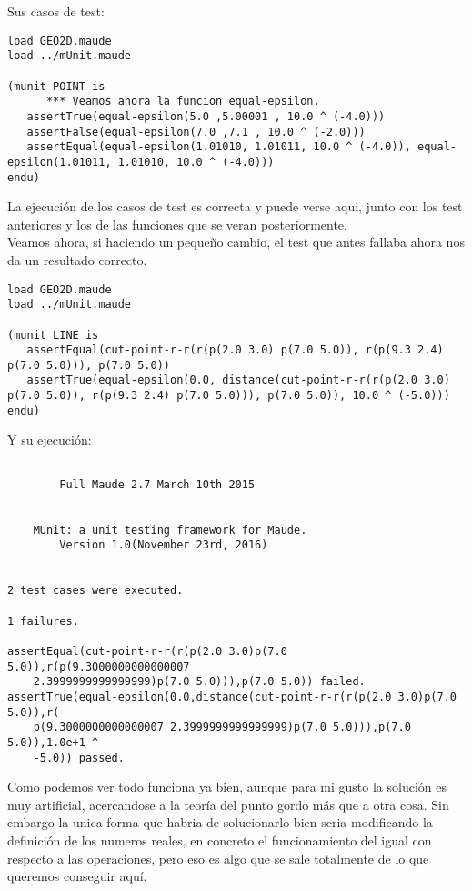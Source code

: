 Sus casos de test:

\begin{verbatim}
load GEO2D.maude
load ../mUnit.maude

(munit POINT is
      *** Veamos ahora la funcion equal-epsilon.
   assertTrue(equal-epsilon(5.0 ,5.00001 , 10.0 ^ (-4.0)))
   assertFalse(equal-epsilon(7.0 ,7.1 , 10.0 ^ (-2.0)))
   assertEqual(equal-epsilon(1.01010, 1.01011, 10.0 ^ (-4.0)), equal-epsilon(1.01011, 1.01010, 10.0 ^ (-4.0)))
endu)

\end{verbatim}

La ejecuci\'on de los casos de test es correcta y puede verse aqui, junto con los test anteriores y los de las funciones que se veran posteriormente. \\

Veamos ahora, si haciendo un pequeño cambio, el test que antes fallaba ahora nos da un resultado correcto.

\begin{verbatim}
load GEO2D.maude
load ../mUnit.maude

(munit LINE is
   assertEqual(cut-point-r-r(r(p(2.0 3.0) p(7.0 5.0)), r(p(9.3 2.4) p(7.0 5.0))), p(7.0 5.0))
   assertTrue(equal-epsilon(0.0, distance(cut-point-r-r(r(p(2.0 3.0) p(7.0 5.0)), r(p(9.3 2.4) p(7.0 5.0))), p(7.0 5.0)), 10.0 ^ (-5.0)))
endu)
\end{verbatim} 

Y su ejecuci\'on:

\begin{verbatim}

	    Full Maude 2.7 March 10th 2015


	MUnit: a unit testing framework for Maude.
		Version 1.0(November 23rd, 2016)


2 test cases were executed.

1 failures.

assertEqual(cut-point-r-r(r(p(2.0 3.0)p(7.0 5.0)),r(p(9.3000000000000007
    2.3999999999999999)p(7.0 5.0))),p(7.0 5.0)) failed.
assertTrue(equal-epsilon(0.0,distance(cut-point-r-r(r(p(2.0 3.0)p(7.0 5.0)),r(
    p(9.3000000000000007 2.3999999999999999)p(7.0 5.0))),p(7.0 5.0)),1.0e+1 ^
    -5.0)) passed.

\end{verbatim} 

Como podemos ver todo funciona ya bien, aunque para mi gusto la soluci\'on es muy artificial, acercandose a la teor\'ia del punto gordo m\'as que a otra cosa. Sin embargo la unica forma que habria de solucionarlo bien seria modificando la definici\'on de los numeros reales, en concreto el funcionamiento del igual con respecto a las operaciones, pero eso es algo que se sale totalmente de lo que queremos conseguir aqu\'i. \par

